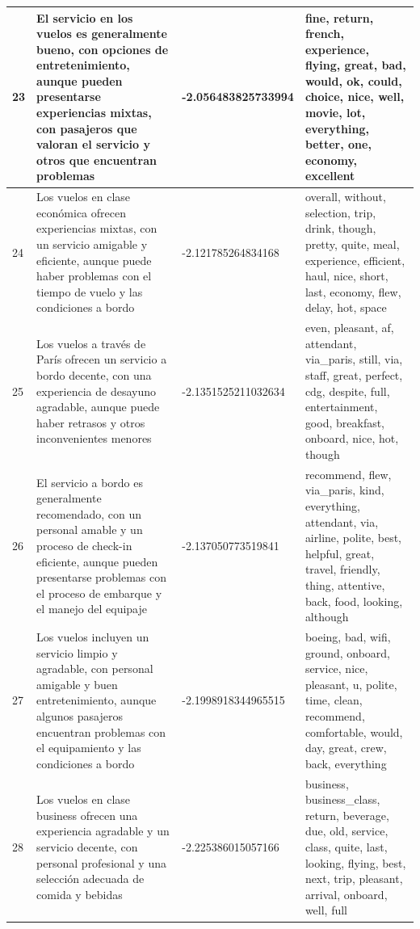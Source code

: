 \documentclass{report}
\begin{document}
{\begin{longtable}{|p{1cm}|p{4cm}|p{4cm}|p{6cm}|}
                    \hline
                    23 & El servicio en los vuelos es generalmente bueno, con opciones de entretenimiento, aunque pueden presentarse experiencias mixtas, con pasajeros que valoran el servicio y otros que encuentran problemas & -2.056483825733994 & fine, return, french, experience, flying, great, bad, would, ok, could, choice, nice, well, movie, lot, everything, better, one, economy, excellent \\
                    \hline
                    24 & Los vuelos en clase económica ofrecen experiencias mixtas, con un servicio amigable y eficiente, aunque puede haber problemas con el tiempo de vuelo y las condiciones a bordo & -2.121785264834168 & overall, without, selection, trip, drink, though, pretty, quite, meal, experience, efficient, haul, nice, short, last, economy, flew, delay, hot, space \\
                    \hline
                    25 & Los vuelos a través de París ofrecen un servicio a bordo decente, con una experiencia de desayuno agradable, aunque puede haber retrasos y otros inconvenientes menores & -2.1351525211032634 & even, pleasant, af, attendant, via\_paris, still, via, staff, great, perfect, cdg, despite, full, entertainment, good, breakfast, onboard, nice, hot, though \\
                    \hline
                    26 & El servicio a bordo es generalmente recomendado, con un personal amable y un proceso de check-in eficiente, aunque pueden presentarse problemas con el proceso de embarque y el manejo del equipaje & -2.137050773519841 & recommend, flew, via\_paris, kind, everything, attendant, via, airline, polite, best, helpful, great, travel, friendly, thing, attentive, back, food, looking, although \\
                    \hline
                    27 & Los vuelos incluyen un servicio limpio y agradable, con personal amigable y buen entretenimiento, aunque algunos pasajeros encuentran problemas con el equipamiento y las condiciones a bordo & -2.1998918344965515 & boeing, bad, wifi, ground, onboard, service, nice, pleasant, u, polite, time, clean, recommend, comfortable, would, day, great, crew, back, everything \\
                    \hline
                    28 & Los vuelos en clase business ofrecen una experiencia agradable y un servicio decente, con personal profesional y una selección adecuada de comida y bebidas & -2.225386015057166 & business, business\_class, return, beverage, due, old, service, class, quite, last, looking, flying, best, next, trip, pleasant, arrival, onboard, well, full \\

\end{longtable}}
\end{document}
